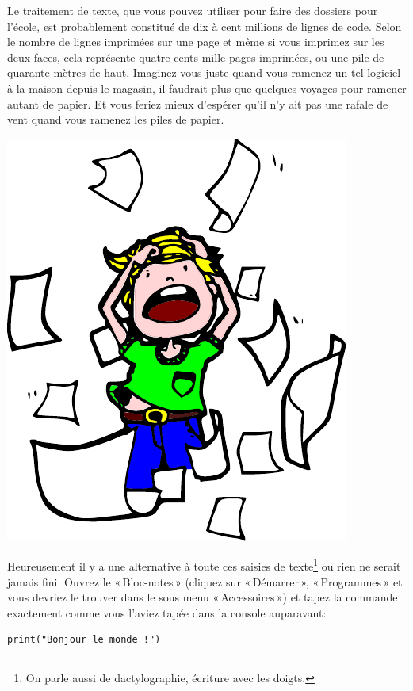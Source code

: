 Le traitement de texte, que vous pouvez utiliser pour faire des dossiers pour l'école, est probablement constitué de dix à cent millions de lignes de code. Selon le nombre de lignes imprimées sur une page et même si vous imprimez sur les deux faces, cela représente quatre cents mille pages imprimées, ou une pile de quarante mètres de haut. Imaginez-vous juste quand vous ramenez un tel logiciel à la maison depuis le magasin, il faudrait plus que quelques voyages pour ramener autant de papier. Et vous feriez mieux d'espérer qu'il n'y ait pas une rafale de vent quand vous ramenez les piles de papier.

\begin{center}
\includegraphics[scale=1]{images/encore.pdf} 
\end{center} 

Heureusement il y a une alternative à toute ces saisies de texte\footnote{On parle aussi de dactylographie, écriture avec les doigts.} ou rien ne serait jamais fini.
Ouvrez le « Bloc-notes » (cliquez sur « Démarrer », « Programmes » et vous devriez le trouver dans le sous menu « Accessoires ») et tapez la commande exactement comme vous l'aviez tapée dans la console auparavant:

\begin{Verbatim}[frame=single,rulecolor=\color{gray}, label=ne pas saisir]
print("Bonjour le monde !")
\end{Verbatim}
\rm

